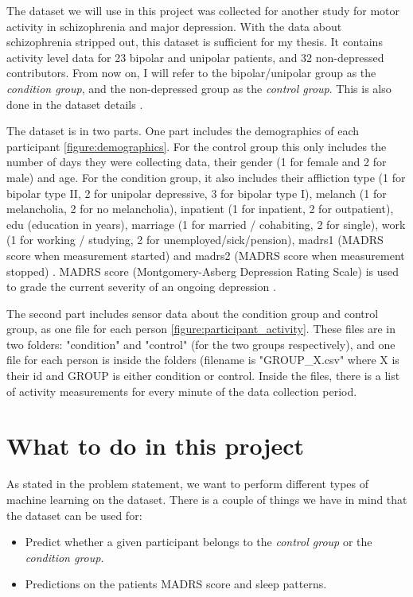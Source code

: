 The dataset we will use in this project \cite{dataset} was collected for another study for motor activity in schizophrenia and major depression. 
With the data about schizophrenia stripped out, this dataset is sufficient for my thesis. It contains activity level data for 23 bipolar and unipolar patients, 
and 32 non-depressed contributors. From now on, I will refer to the bipolar/unipolar group as the \textit{condition group}, and the non-depressed group as 
the \textit{control group}. This is also done in the dataset details \cite{dataset_details}.

The dataset is in two parts. One part includes the demographics of each participant \ref{figure:demographics}. For the control group this only includes the number of 
days they were collecting data, their gender (1 for female and 2 for male) and age. For the condition group, it also includes their affliction type (1 for bipolar
type II, 2 for unipolar depressive, 3 for bipolar type I), melanch (1 for melancholia, 2 for no melancholia), inpatient (1 for inpatient, 2 for outpatient),
edu (education in years), marriage (1 for married / cohabiting, 2 for single), work (1 for working / studying, 2 for unemployed/sick/pension), madrs1 (MADRS score 
when measurement started) and madrs2 (MADRS score when measurement stopped) \cite{dataset_details}. MADRS score (Montgomery-Asberg Depression Rating Scale) 
is used to grade the current severity of an ongoing depression \cite{dataset_details}.

The second part includes sensor data about the condition group and control group, as one file for each person \ref{figure:participant_activity}. 
These files are in two folders: "condition" and "control" (for the two groups respectively), and one file for each person is inside the folders (filename 
is "GROUP\_X.csv" where X is their id and GROUP is either condition or control. Inside the files, there is a list of activity measurements for every 
minute of the data collection period.

\section{What to do in this project}
As stated in the problem statement, we want to perform different types of machine learning on the dataset. 
There is a couple of things we have in mind that the dataset can be used for:

\begin{itemize}
    \item Predict whether a given participant belongs to the \textit{control group} or the \textit{condition group}.
    \item Predictions on the patients MADRS score and sleep patterns.
\end{itemize}

